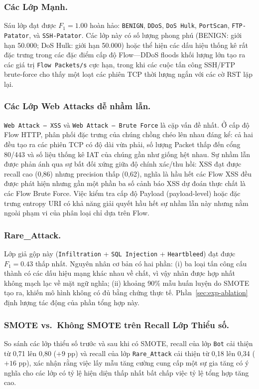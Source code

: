 \subsubsection*{Các Lớp Mạnh.}
Sáu lớp đạt được $F_1 = 1.00$ hoàn hảo: \texttt{BENIGN}, \texttt{DDoS}, \texttt{DoS Hulk}, \texttt{PortScan}, \texttt{FTP-Patator}, và \texttt{SSH-Patator}. Các lớp này có số lượng phong phú (BENIGN: giới hạn 50.000; DoS Hulk: giới hạn 50.000) hoặc thể hiện các dấu hiệu thống kê rất đặc trưng trong các đặc điểm cấp độ Flow---DDoS floods khối lượng lớn tạo ra các giá trị \texttt{Flow Packets/s} cực hạn, trong khi các cuộc tấn công SSH/FTP brute-force cho thấy một loạt các phiên TCP thời lượng ngắn với các cờ RST lặp lại.

\subsubsection*{Các Lớp Web Attacks dễ nhầm lẫn.}
\texttt{Web Attack -- XSS} và \texttt{Web Attack -- Brute Force} là cặp vấn đề nhất. Ở cấp độ Flow HTTP, phân phối đặc trưng của chúng chồng chéo lên nhau đáng kể: cả hai đều tạo ra các phiên TCP có độ dài vừa phải, số lượng Packet thấp đến cổng 80/443 và số liệu thống kê IAT của chúng gần như giống hệt nhau. Sự nhầm lẫn được phản ánh qua sự bất đối xứng giữa độ chính xác/thu hồi: XSS đạt được recall cao (0,86) nhưng precision thấp (0,62), nghĩa là hầu hết các Flow XSS đều được phát hiện nhưng gần một phần ba số cảnh báo XSS dự đoán thực chất là các Flow Brute Force. Việc kiểm tra cấp độ Payload (payload-level) hoặc đặc trưng entropy URI có khả năng giải quyết hầu hết sự nhầm lẫn này nhưng nằm ngoài phạm vi của phân loại chỉ dựa trên Flow.

\subsubsection*{Rare\_Attack.}
Lớp giả gộp này (\texttt{Infiltration} + \texttt{SQL Injection} + \texttt{Heartbleed}) đạt được $F_1 = 0.43$ thấp nhất. Nguyên nhân cơ bản có hai phần: (i) ba loại tấn công cấu thành có các dấu hiệu mạng khác nhau về chất, vì vậy nhãn được hợp nhất không mạch lạc về mặt ngữ nghĩa; (ii) khoảng 90\% mẫu huấn luyện do SMOTE tạo ra, khiến mô hình không có đủ bằng chứng thực tế. Phần~\ref{sec:exp-ablation} định lượng tác động của phần tổng hợp này.

\subsubsection*{SMOTE vs.\ Không SMOTE trên Recall Lớp Thiểu số.}
So sánh các lớp thiểu số trước và sau khi có SMOTE, recall của lớp \texttt{Bot} cải thiện từ 0,71 lên 0,80 ($+9$ pp) và recall của lớp \texttt{Rare\_Attack} cải thiện từ 0,18 lên 0,34 ($+16$ pp), xác nhận rằng việc lấy mẫu tăng cường cung cấp một sự gia tăng có ý nghĩa cho các lớp có tỷ lệ hiện diện thấp nhất bất chấp việc tỷ lệ tổng hợp tăng cao.

